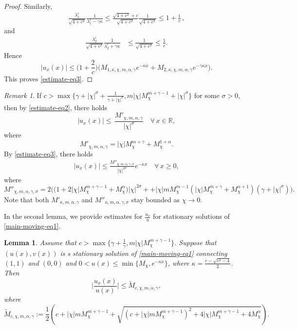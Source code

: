 \documentclass[11pt]{article} %
\newtheorem{lemma}{Lemma}[section]
\theoremstyle{remark}
\newtheorem{remark}{Remark}[section]
\theoremstyle{remark}
\numberwithin{equation}{section}
\numberwithin{figure}{section}
\numberwithin{table}{section}
\newcommand\RR{\ensuremath{\mathbb{R}}}
\begin{document}
\begin{proof}
Similarly, 
\begin{align*}
\frac{\lambda_1^c}{\sqrt{4+c^2}}\frac{1}{\lambda_1^c -\gamma \kappa}\le    
\frac{\sqrt{4+c^2}+c}{\sqrt{4+c^2}}\frac{1}{\sqrt{4+c^2}}\le  1+\frac{1}{c}\, ,
\end{align*}
and
\begin{align*}
\frac{\lambda_2^c}{\sqrt{4+c^2}}\frac{1}{\lambda_2^c+\gamma \kappa}&\le \frac{1}{\sqrt{4+c^2}}\le \frac{1}{c}.
\end{align*} 
Hence
$$
|u_x(x)|\le  \Big(1+\frac{2}{c}\Big) \Big(M_{1,\kappa,\chi,m,\alpha,\gamma}  e^{-\kappa x}+M_{2,\kappa,\chi,m,\alpha,\gamma}e^{-\gamma\kappa x}\Big).
$$
This proves \eqref{estimate-eq3}.
\end{proof}

\begin{remark}
\label{estimate-rk1}
 If {$c>\max\big\{\gamma+|\chi|^\sigma+\frac{1}{\gamma+|\chi|^\sigma }, m|\chi| M^{m+\gamma-1}_\chi +|\chi|^\sigma\}$ for some $\sigma>0$,} then  by \eqref{estimate-eq2}, there holds
\begin{equation}
\label{estimate-eq2-1}
 |  u_x(x)|  \le  \,  \frac{M'_{\chi,m,\alpha,\gamma}}{|\chi|^\sigma }  \quad \forall\, x\in\RR,
\end{equation}
where 
$$
M'_{\chi,m,\alpha,\gamma}= |\chi| M_\chi^{m+\gamma} +M_\chi^{1+\alpha}.
$$
By \eqref{estimate-eq3}, there holds
\begin{align}
\label{estimate-eq3-1}
|u_x(x)|\le   \frac{M''_{\chi,m,\alpha,\gamma,\sigma}}{|\chi|^{2\sigma}} e^{-\kappa x} \quad \forall\, x\ge 0,
\end{align}
where
$$
M''_{\chi,m,\alpha,\gamma,\sigma}=2\Big(\big(1+2 |\chi| M^{m+\gamma-1}_\chi+M_\chi^{\alpha}\big)|\chi|^{2\sigma}+
+|\chi| m M_{\chi}^{m-1} (|\chi| M_{\chi}^{m+\gamma}+M_\chi^{\alpha+1}) (\gamma+|\chi|^\sigma)\Big). 
$$
Note that both $M'_{\kappa,m,\alpha,\gamma}$ and $M''_{\kappa,m,\alpha,\gamma,\sigma}$ stay bounded as $\chi\to 0$.
\end{remark}


In the second lemma, we provide estimates for $\frac{u_x}{u}$ for stationary solutions of \eqref{main-moving-eq1}.

\begin{lemma}
\label{estimate-lm2}Assume that $c>\max\big\{\gamma+\frac{1}{\gamma}, m|\chi| M^{m+\gamma-1}_\chi\big\}$.   Suppose that  $(u(x),v(x))$ is  s stationary  solution of \eqref{main-moving-eq1}  connecting $(1,1)$ and $(0,0)$  and $0<u(x)\le \min\{M_\chi, e^{-\kappa x}\}$, where $\kappa=\frac{c-\sqrt{c^2-4}}{2}$.
Then
$$
\big|\frac{u_x(x)}{u(x)}\big|\le  \widetilde M_{c,\chi,m,\alpha,\gamma},
$$
where
$$
\widetilde M_{c,\chi,m,\alpha,\gamma}:= \frac{1}{2}\left( c+|\chi| m M_{\chi}^{m+\gamma-1}+\sqrt{ (c+|\chi| m M_{\chi}^{m+\gamma-1})^2 +4|\chi| M_{\chi}^{m+\gamma-1}+4M_{\chi}^\alpha}\right).
$$
\end{lemma}
\end{document}
